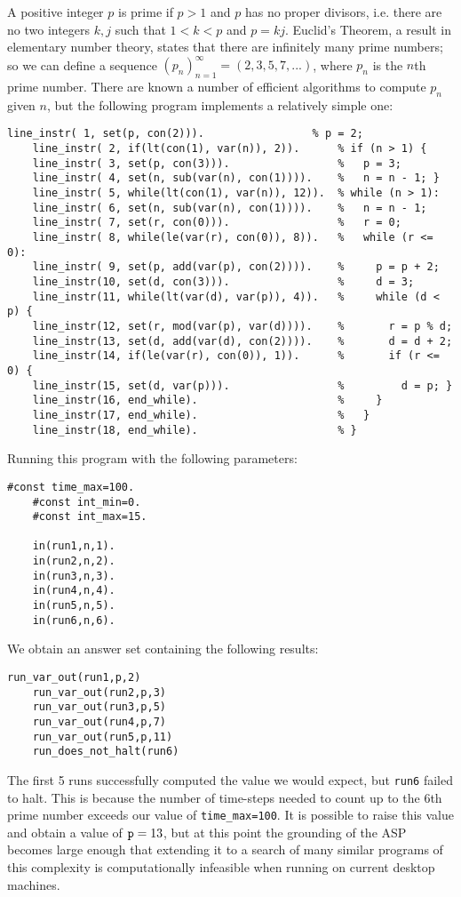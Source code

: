 \documentclass[a4paper,twoside,notitlepage]{report}
\begin{document}
A positive integer $p$ is prime if $p>1$ and $p$ has no proper divisors, 
i.e. there are no two integers $k,j$ such that $1<k<p$ and $p=kj$. 
Euclid's Theorem, a result in elementary number theory, states that there 
are infinitely many prime numbers; so we can define a sequence 
$(p_n)_{n=1}^\infty=(2, 3, 5, 7, ...)$, where $p_n$ is the $n$th prime 
number. There are known a number of efficient algorithms to compute $p_n$ 
given $n$, but the following program implements a relatively simple one:
\begin{Verbatim}[samepage=true]
    line_instr( 1, set(p, con(2))).                 % p = 2;
    line_instr( 2, if(lt(con(1), var(n)), 2)).      % if (n > 1) {
    line_instr( 3, set(p, con(3))).                 %   p = 3;
    line_instr( 4, set(n, sub(var(n), con(1)))).    %   n = n - 1; }
    line_instr( 5, while(lt(con(1), var(n)), 12)).  % while (n > 1):
    line_instr( 6, set(n, sub(var(n), con(1)))).    %   n = n - 1;
    line_instr( 7, set(r, con(0))).                 %   r = 0;
    line_instr( 8, while(le(var(r), con(0)), 8)).   %   while (r <= 0):
    line_instr( 9, set(p, add(var(p), con(2)))).    %     p = p + 2;
    line_instr(10, set(d, con(3))).                 %     d = 3;
    line_instr(11, while(lt(var(d), var(p)), 4)).   %     while (d < p) {
    line_instr(12, set(r, mod(var(p), var(d)))).    %       r = p % d;
    line_instr(13, set(d, add(var(d), con(2)))).    %       d = d + 2;
    line_instr(14, if(le(var(r), con(0)), 1)).      %       if (r <= 0) {
    line_instr(15, set(d, var(p))).                 %         d = p; }
    line_instr(16, end_while).                      %     }
    line_instr(17, end_while).                      %   }
    line_instr(18, end_while).                      % }
\end{Verbatim}

Running this program with the following parameters:
\begin{Verbatim}[samepage=true]
    #const time_max=100.
    #const int_min=0.
    #const int_max=15.
    
    in(run1,n,1).
    in(run2,n,2).
    in(run3,n,3).
    in(run4,n,4).
    in(run5,n,5).
    in(run6,n,6).
\end{Verbatim}
We obtain an answer set containing the following results:
\begin{Verbatim}[samepage=true]
    run_var_out(run1,p,2)
    run_var_out(run2,p,3)
    run_var_out(run3,p,5)
    run_var_out(run4,p,7)
    run_var_out(run5,p,11)
    run_does_not_halt(run6)
\end{Verbatim}
The first 5 runs successfully computed the value we would expect, but 
\verb|run6| failed to halt. This is because the number of time-steps 
needed to count up to the 6th prime number exceeds our value of 
\verb|time_max=100|. It is possible to raise this value and obtain a value 
of $\verb|p|=13$, but at this point the grounding of the ASP becomes large 
enough that extending it to a search of many similar programs of this 
complexity is computationally infeasible when running on current desktop 
machines.
\end{document}
